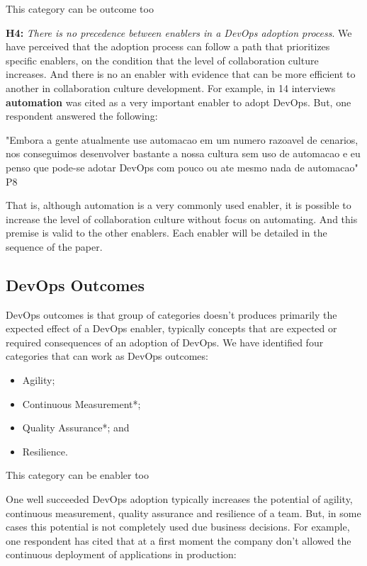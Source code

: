 \footnotesize * This category can be outcome too

\normalsize
\textbf{H4:} \textit{There is no precedence between enablers in a DevOps adoption process}. We have perceived that the adoption process can follow a path that prioritizes specific enablers, on the condition that the level of collaboration culture increases. And there is no an enabler with evidence that can be more efficient to another in collaboration culture development. For example, in 14 interviews \textbf{automation} was cited as a very important enabler to adopt DevOps. But, one respondent answered the following:

"Embora a gente atualmente use automacao em um numero razoavel de cenarios, nos conseguimos desenvolver bastante a nossa cultura sem uso de automacao e eu penso que pode-se adotar DevOps com pouco ou ate mesmo nada de automacao" P8

That is, although automation is a very commonly used enabler, it is possible to increase the level of collaboration culture without focus on automating. And this premise is valid to the other enablers. Each enabler will be detailed in the sequence of the paper.

\subsection{DevOps Outcomes}
DevOps outcomes is that group of categories doesn't produces primarily the expected effect of a DevOps enabler, typically concepts that are expected or required consequences of an adoption of DevOps. We have identified four categories that can work as DevOps outcomes:

\begin{itemize}
\item Agility;
\item Continuous Measurement*;
\item Quality Assurance*; and
\item Resilience.
\end{itemize}

\footnotesize * This category can be enabler too

\normalsize
One well succeeded DevOps adoption typically increases the potential of agility, continuous measurement, quality assurance and resilience of a team. But, in some cases this potential is not completely used due business decisions. For example, one respondent has cited that at a first moment the company don't allowed the continuous deployment of applications in production:

